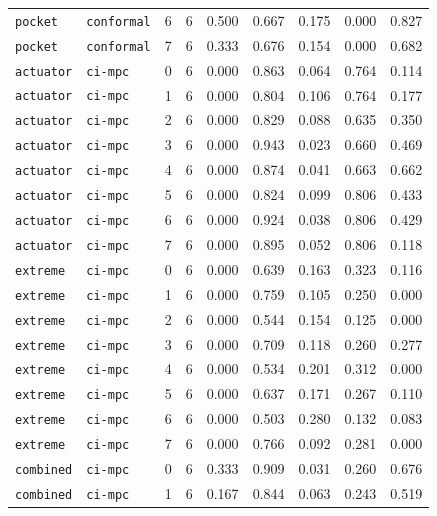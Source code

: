 \documentclass{article}
\begin{document}
\begin{center}
\begin{tabular}{lllcccccc}
\texttt{pocket} & \texttt{conformal} & 6 & 6 & 0.500 & 0.667 & 0.175 & 0.000 & 0.827 \\
\texttt{pocket} & \texttt{conformal} & 7 & 6 & 0.333 & 0.676 & 0.154 & 0.000 & 0.682 \\
\texttt{actuator} & \texttt{ci-mpc} & 0 & 6 & 0.000 & 0.863 & 0.064 & 0.764 & 0.114 \\
\texttt{actuator} & \texttt{ci-mpc} & 1 & 6 & 0.000 & 0.804 & 0.106 & 0.764 & 0.177 \\
\texttt{actuator} & \texttt{ci-mpc} & 2 & 6 & 0.000 & 0.829 & 0.088 & 0.635 & 0.350 \\
\texttt{actuator} & \texttt{ci-mpc} & 3 & 6 & 0.000 & 0.943 & 0.023 & 0.660 & 0.469 \\
\texttt{actuator} & \texttt{ci-mpc} & 4 & 6 & 0.000 & 0.874 & 0.041 & 0.663 & 0.662 \\
\texttt{actuator} & \texttt{ci-mpc} & 5 & 6 & 0.000 & 0.824 & 0.099 & 0.806 & 0.433 \\
\texttt{actuator} & \texttt{ci-mpc} & 6 & 6 & 0.000 & 0.924 & 0.038 & 0.806 & 0.429 \\
\texttt{actuator} & \texttt{ci-mpc} & 7 & 6 & 0.000 & 0.895 & 0.052 & 0.806 & 0.118 \\
\texttt{extreme} & \texttt{ci-mpc} & 0 & 6 & 0.000 & 0.639 & 0.163 & 0.323 & 0.116 \\
\texttt{extreme} & \texttt{ci-mpc} & 1 & 6 & 0.000 & 0.759 & 0.105 & 0.250 & 0.000 \\
\texttt{extreme} & \texttt{ci-mpc} & 2 & 6 & 0.000 & 0.544 & 0.154 & 0.125 & 0.000 \\
\texttt{extreme} & \texttt{ci-mpc} & 3 & 6 & 0.000 & 0.709 & 0.118 & 0.260 & 0.277 \\
\texttt{extreme} & \texttt{ci-mpc} & 4 & 6 & 0.000 & 0.534 & 0.201 & 0.312 & 0.000 \\
\texttt{extreme} & \texttt{ci-mpc} & 5 & 6 & 0.000 & 0.637 & 0.171 & 0.267 & 0.110 \\
\texttt{extreme} & \texttt{ci-mpc} & 6 & 6 & 0.000 & 0.503 & 0.280 & 0.132 & 0.083 \\
\texttt{extreme} & \texttt{ci-mpc} & 7 & 6 & 0.000 & 0.766 & 0.092 & 0.281 & 0.000 \\
\texttt{combined} & \texttt{ci-mpc} & 0 & 6 & 0.333 & 0.909 & 0.031 & 0.260 & 0.676 \\
\texttt{combined} & \texttt{ci-mpc} & 1 & 6 & 0.167 & 0.844 & 0.063 & 0.243 & 0.519 \\
\bottomrule
\end{tabular}
\end{center}
\end{document}
